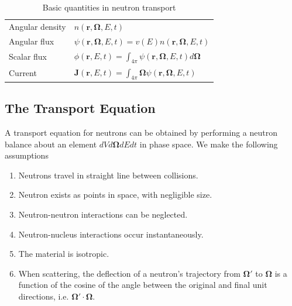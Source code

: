 \documentclass[11pt]{article}
\renewcommand\vec{\mathbf}
\begin{document}
\begin{table}
  \centering
  \caption{Basic quantities in neutron transport}
  \begin{tabular}{ll}
  \hline
  Angular density & $n(\vec{r},\vec{\Omega},E,t)$ \\
  Angular flux & $\psi(\vec{r},\vec{\Omega},E,t) = v(E) n(\vec{r},\vec{\Omega},E,t)$ \\
  Scalar flux & $\phi(\vec{r},E,t) = \int_{4\pi} \psi(\vec{r},\vec{\Omega},E,t) d\vec{\Omega}$ \\
  Current & $\vec{J}(\vec{r},E,t) = \int_{4\pi} \vec{\Omega} \psi(\vec{r},\vec{\Omega},E,t)$ \\
  \hline
  \end{tabular}
\end{table}

\subsection{The Transport Equation}
\label{sec:orgheadline51}
A transport equation for neutrons can be obtained by performing a neutron balance about an element \(dV d\vec{\Omega} dE dt\) in phase space.  We make the following assumptions
\begin{enumerate}
\item Neutrons travel in straight line between collisions.
\item Neutron exists as points in space, with negligible size.
\item Neutron-neutron interactions can be neglected.
\item Neutron-nucleus interactions occur instantaneously.
\item The material is isotropic.
\item When scattering, the deflection of a neutron's trajectory from \(\vec{\Omega}'\) to \(\vec{\Omega}\) is a function of the cosine of the angle between the original and final unit directions, i.e. \(\vec{\Omega}' \cdot \vec{\Omega}\).
\end{enumerate}
\end{document}
